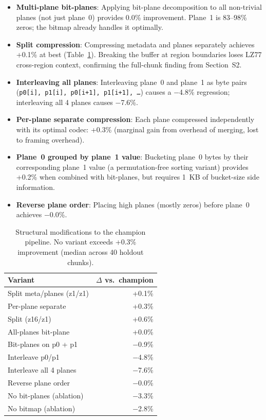 \documentclass[10pt,twocolumn,letterpaper]{article}
\begin{document}
\begin{itemize}
\item \textbf{Multi-plane bit-planes}: Applying bit-plane decomposition to all non-trivial planes (not just plane~0) provides 0.0\% improvement. Plane~1 is 83--98\% zeros; the bitmap already handles it optimally.
\item \textbf{Split compression}: Compressing metadata and planes separately achieves +0.1\% at best (Table~\ref{tab:structural_v2}). Breaking the buffer at region boundaries loses LZ77 cross-region context, confirming the full-chunk finding from Section~S2.
\item \textbf{Interleaving all planes}: Interleaving plane~0 and plane~1 as byte pairs (\texttt{p0[i], p1[i], p0[i+1], p1[i+1], \ldots}) causes a $-$4.8\% regression; interleaving all 4 planes causes $-$7.6\%.
\item \textbf{Per-plane separate compression}: Each plane compressed independently with its optimal codec: +0.3\% (marginal gain from overhead of merging, lost to framing overhead).
\item \textbf{Plane~0 grouped by plane~1 value}: Bucketing plane~0 bytes by their corresponding plane~1 value (a permutation-free sorting variant) provides +0.2\% when combined with bit-planes, but requires 1~KB of bucket-size side information.
\item \textbf{Reverse plane order}: Placing high planes (mostly zeros) before plane~0 achieves $-$0.0\%.
\end{itemize}

\begin{table}[h]
\centering
\caption{Structural modifications to the champion pipeline. No variant exceeds +0.3\% improvement (median across 40 holdout chunks).}
\label{tab:structural_v2}
\footnotesize
\begin{tabular}{lr}
\toprule
Variant & $\Delta$ vs.\ champion \\
\midrule
Split meta/planes (z1/z1) & +0.1\% \\
Per-plane separate & +0.3\% \\
Split (z16/z1) & +0.6\% \\
All-planes bit-plane & +0.0\% \\
Bit-planes on p0 + p1 & $-$0.9\% \\
Interleave p0/p1 & $-$4.8\% \\
Interleave all 4 planes & $-$7.6\% \\
Reverse plane order & $-$0.0\% \\
No bit-planes (ablation) & $-$3.3\% \\
No bitmap (ablation) & $-$2.8\% \\
\bottomrule
\end{tabular}
\end{table}
\end{document}

